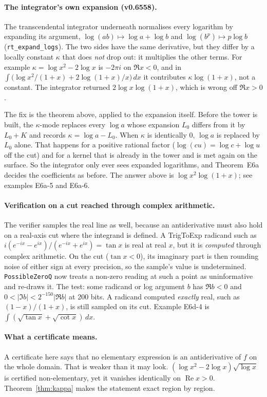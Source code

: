 \documentclass[11pt]{article}
\theoremstyle{definition}
\theoremstyle{remark}
\newcommand{\code}[1]{\texttt{#1}}
\begin{document}
\paragraph{The integrator's own expansion (v0.6558).}
The transcendental integrator underneath normalises every logarithm by
expanding its argument, $\log(ab)\mapsto\log a+\log b$ and
$\log(b^p)\mapsto p\log b$ (\code{rt\_expand\_logs}). The two sides have the
same derivative, but they differ by a locally constant $\kappa$ that does
\emph{not} drop out: it multiplies the other terms. For example
$\kappa=\log x^2-2\log x$ is $-2\pi i$ on $\Re x<0$, and in
$\int\bigl(\log x^2/(1+x)+2\log(1+x)/x\bigr)\,dx$ it contributes
$\kappa\log(1+x)$, not a constant. The integrator returned
$2\log x\log(1+x)$, which is wrong off $\Re x>0$.

The fix is the theorem above, applied to the expansion itself. Before the
tower is built, the $\kappa$-mode replaces every $\log a$ whose expansion
$L_0$ differs from it by $L_0+K$ and records $\kappa=\log a-L_0$. When $\kappa$
is identically $0$, $\log a$ is replaced by $L_0$ alone. That happens for a
positive rational factor ($\log(cu)=\log c+\log u$ off the cut) and for a
kernel that is already in the tower and is met again on the surface. So the
integrator only ever sees expanded logarithms, and Theorem~E6a decides the
coefficients as before. The answer above is $\log x^2\log(1+x)$; see
examples E6a-5 and E6a-6.

\paragraph{Verification on a cut reached through complex arithmetic.}
The verifier samples the real line as well, because an antiderivative must also
hold on a real-axis cut where the integrand is defined. A TrigToExp radicand
such as $i(e^{-ix}-e^{ix})/(e^{-ix}+e^{ix})=\tan x$ is real at real $x$, but it
is \emph{computed} through complex arithmetic. On the cut ($\tan x<0$), its
imaginary part is then rounding noise of either sign at every precision, so
the sample's value is undetermined. \code{PossibleZeroQ} now treats a
non-zero reading at such a point as uninformative and re-draws it. The test:
some radicand or log argument $b$ has $\Re b<0$ and $0<|\Im b|<2^{-150}|\Re b|$
at 200 bits. A radicand computed \emph{exactly} real, such as $(1-x)/(1+x)$,
is still sampled on its cut. Example E6d-4 is
$\int(\sqrt{\tan x}+\sqrt{\cot x})\,dx$.

\paragraph{What a certificate means.} A certificate here says that no
elementary expression is an antiderivative of $f$ on the whole domain. That is
weaker than it may look. $(\log x^2-2\log x)\sqrt{\log x}$ is certified
non-elementary, yet it vanishes identically on $\operatorname{Re}x>0$.
Theorem~\ref{thm:kappa} makes the statement exact region by region.
\end{document}
